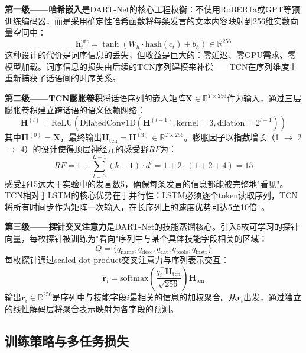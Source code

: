 \documentclass[12pt,a4paper]{ctexart}
\begin{document}
\textbf{第一级——哈希嵌入}是DART-Net的核心工程权衡：不使用RoBERTa或GPT等预训练编码器，而是采用确定性哈希函数将每条发言的文本内容映射到256维实数向量空间中：
\begin{equation}
\mathbf{h}_t^{\text{utt}} = \tanh(W_h \cdot \text{hash}(c_t) + b_h) \in \mathbb{R}^{256}
\label{eq:hash_enc}
\end{equation}
这种设计的代价是词序信息的丢失，但收益是巨大的：零延迟、零GPU需求、零模型加载。词序信息的损失由后续的TCN序列建模来补偿——TCN在序列维度上重新捕获了话语间的时序关系。

\textbf{第二级——TCN膨胀卷积}将话语序列的嵌入矩阵$\mathbf{X} \in \mathbb{R}^{T \times 256}$作为输入，通过三层膨胀卷积建立跨话语的语义依赖网络：
\begin{equation}
\mathbf{H}^{(l)} = \text{ReLU}(\text{DilatedConv1D}(\mathbf{H}^{(l-1)}, \text{kernel}=3, \text{dilation}=2^{l-1}))
\label{eq:tcn_layer}
\end{equation}
其中$\mathbf{H}^{(0)} = \mathbf{X}$，最终输出$\mathbf{H}_{\text{tcn}} = \mathbf{H}^{(3)} \in \mathbb{R}^{T \times 256}$。膨胀因子以指数增长（1 $\to$ 2 $\to$ 4）的设计使得顶层神经元的感受野$RF$为：
\begin{equation}
RF = 1 + \sum_{l=0}^{L-1} (k - 1) \cdot d^l = 1 + 2 \cdot (1 + 2 + 4) = 15
\label{eq:rf}
\end{equation}
感受野15远大于实验中的发言数5，确保每条发言的信息都能被完整地"看见"。TCN相对于LSTM的核心优势在于并行性：LSTM必须逐个token读取序列，TCN将所有时间步作为矩阵一次输入，在长序列上的速度优势可达5至10倍~\cite{bai2018tcn}。

\textbf{第三级——探针交叉注意力}是DART-Net的技能蒸馏核心。引入5枚可学习的探针向量，每枚探针被训练为"看向"序列中与某个具体技能字段相关的区域：
\begin{equation}
Q = \{q_{\text{name}}, q_{\text{desc}}, q_{\text{cat}}, q_{\text{tools}}, q_{\text{instr}}\}
\label{eq:probes}
\end{equation}
每枚探针通过scaled dot-product交叉注意力与序列表示交互：
\begin{equation}
\mathbf{r}_i = \text{softmax}\left(\frac{q_i^\top \mathbf{H}_{\text{tcn}}}{\sqrt{256}}\right) \mathbf{H}_{\text{tcn}}
\label{eq:cross_attn}
\end{equation}
输出$\mathbf{r}_i \in \mathbb{R}^{256}$是序列中与技能字段$i$最相关的信息的加权聚合。从$\mathbf{r}_i$出发，通过独立的线性解码层将聚合表示映射为各字段的预测。

\subsection{训练策略与多任务损失}
\end{document}
